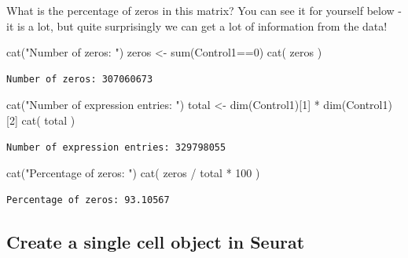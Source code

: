 \documentclass[
  letterpaper,
  DIV=11,
  numbers=noendperiod]{scrartcl}
\newenvironment{Shaded}{\begin{snugshade}}{\end{snugshade}}
\newcommand{\DecValTok}[1]{\textcolor[rgb]{0.68,0.00,0.00}{#1}}
\newcommand{\FunctionTok}[1]{\textcolor[rgb]{0.28,0.35,0.67}{#1}}
\newcommand{\NormalTok}[1]{\textcolor[rgb]{0.00,0.23,0.31}{#1}}
\newcommand{\OtherTok}[1]{\textcolor[rgb]{0.00,0.23,0.31}{#1}}
\newcommand{\SpecialCharTok}[1]{\textcolor[rgb]{0.37,0.37,0.37}{#1}}
\newcommand{\StringTok}[1]{\textcolor[rgb]{0.13,0.47,0.30}{#1}}
\begin{document}
What is the percentage of zeros in this matrix? You can see it for
yourself below - it is a lot, but quite surprisingly we can get a lot of
information from the data!

\begin{Shaded}
\begin{Highlighting}[]
\FunctionTok{cat}\NormalTok{(}\StringTok{"Number of zeros: "}\NormalTok{)}
\NormalTok{zeros }\OtherTok{\textless{}{-}}  \FunctionTok{sum}\NormalTok{(Control1}\SpecialCharTok{==}\DecValTok{0}\NormalTok{)}
\FunctionTok{cat}\NormalTok{( zeros )}
\end{Highlighting}
\end{Shaded}

\begin{verbatim}
Number of zeros: 307060673
\end{verbatim}

\begin{Shaded}
\begin{Highlighting}[]
\FunctionTok{cat}\NormalTok{(}\StringTok{"Number of expression entries: "}\NormalTok{)}
\NormalTok{total }\OtherTok{\textless{}{-}} \FunctionTok{dim}\NormalTok{(Control1)[}\DecValTok{1}\NormalTok{] }\SpecialCharTok{*} \FunctionTok{dim}\NormalTok{(Control1)[}\DecValTok{2}\NormalTok{]}
\FunctionTok{cat}\NormalTok{( total )}
\end{Highlighting}
\end{Shaded}

\begin{verbatim}
Number of expression entries: 329798055
\end{verbatim}

\begin{Shaded}
\begin{Highlighting}[]
\FunctionTok{cat}\NormalTok{(}\StringTok{"Percentage of zeros: "}\NormalTok{)}
\FunctionTok{cat}\NormalTok{( zeros }\SpecialCharTok{/}\NormalTok{ total }\SpecialCharTok{*} \DecValTok{100}\NormalTok{ )}
\end{Highlighting}
\end{Shaded}

\begin{verbatim}
Percentage of zeros: 93.10567
\end{verbatim}

\subsection{Create a single cell object in
Seurat}\label{create-a-single-cell-object-in-seurat}
\end{document}
